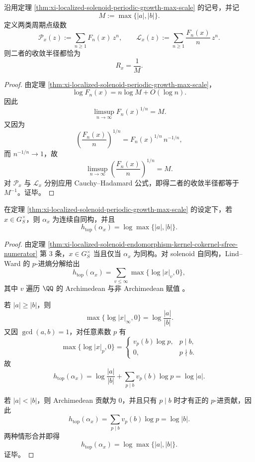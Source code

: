 \begin{corollary}\label{cor:xi-localized-solenoid-periodic-series-radius-max-scale}
沿用定理 \ref{thm:xi-localized-solenoid-periodic-growth-max-scale} 的记号，并记
\[
M:=\max\{|a|,|b|\}.
\]
定义两类周期点级数
\[
\mathcal P_x(z):=\sum_{n\ge 1}F_n(x)\,z^n,
\qquad
\mathcal L_x(z):=\sum_{n\ge 1}\frac{F_n(x)}{n}\,z^n.
\]
则二者的收敛半径都恰为
\[
\boxed{\;
R_x=\frac{1}{M}.\;}
\]
\end{corollary}
\begin{proof}
由定理 \ref{thm:xi-localized-solenoid-periodic-growth-max-scale}，
\[
\log F_n(x)=n\log M+O(\log n).
\]
因此
\[
\limsup_{n\to\infty}F_n(x)^{1/n}=M.
\]
又因为
\[
\left(\frac{F_n(x)}{n}\right)^{1/n}
=
F_n(x)^{1/n}\,n^{-1/n},
\]
而 \(n^{-1/n}\to 1\)，故
\[
\limsup_{n\to\infty}\left(\frac{F_n(x)}{n}\right)^{1/n}=M.
\]
对 \(\mathcal P_x\) 与 \(\mathcal L_x\) 分别应用 Cauchy--Hadamard 公式，即得二者的收敛半径都等于 \(M^{-1}\)。证毕。
\end{proof}

\begin{corollary}\label{cor:xi-localized-solenoid-unit-entropy-max-scale}
在定理 \ref{thm:xi-localized-solenoid-periodic-growth-max-scale} 的设定下，若 \(x\in G_S^\times\)，则 \(\alpha_x\) 为连续自同构，并且
\[
\boxed{\;
h_{\mathrm{top}}(\alpha_x)=\log\max\{|a|,|b|\}.\;}
\]
\end{corollary}
\begin{proof}
由定理 \ref{thm:xi-localized-solenoid-endomorphism-kernel-cokernel-sfree-numerator} 第 \(3\) 条，\(x\in G_S^\times\) 当且仅当 \(\alpha_x\) 为同构。对 solenoid 自同构，Lind--Ward 的 \(p\)-进熵分解给出
\[
h_{\mathrm{top}}(\alpha_x)
=
\sum_{v\le \infty}\max\{\log|x|_v,0\},
\]
其中 \(v\) 遍历 \(\QQ\) 的 Archimedean 与非 Archimedean 赋值 \cite{LindWard1988SolenoidsPadicEntropy}。

若 \(|a|\ge |b|\)，则
\[
\max\{\log|x|_\infty,0\}=\log\frac{|a|}{|b|}.
\]
又因 \(\gcd(a,b)=1\)，对任意素数 \(p\) 有
\[
\max\{\log|x|_p,0\}=
\begin{cases}
v_p(b)\log p,& p\mid b,\\
0,& p\nmid b.
\end{cases}
\]
故
\[
h_{\mathrm{top}}(\alpha_x)
=
\log\frac{|a|}{|b|}
+\sum_{p\mid b}v_p(b)\log p
=
\log|a|.
\]

若 \(|a|<|b|\)，则 Archimedean 贡献为 \(0\)，并且只有 \(p\mid b\) 时才有正的 \(p\)-进贡献，因此
\[
h_{\mathrm{top}}(\alpha_x)
=
\sum_{p\mid b}v_p(b)\log p
=
\log|b|.
\]
两种情形合并即得
\[
h_{\mathrm{top}}(\alpha_x)=\log\max\{|a|,|b|\}.
\]
证毕。
\end{proof}

